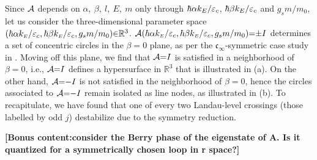\documentclass[aps, prb, showpacs, twocolumn, notitlepage, superscriptaddress]{revtex4-1}
\begin{document}
Since ${\cal A}$ depends on $\alpha,~\beta,~l,~E,~m$ only through $\hbar\alpha k_E /\varepsilon_c$, $\hbar\beta k_E /\varepsilon_c$ and $g_sm/m_0$, let us consider the three-dimensional parameter space $(\hbar\alpha k_{\scriptscriptstyle{E}}/\varepsilon_c,\hbar\beta k_{\scriptscriptstyle{E}}/\varepsilon_c,g_sm/m_0){\in} \mathbb{R}^3$.  ${\cal A}(\hbar\alpha k_{\scriptscriptstyle{E}}/\varepsilon_c,\hbar\beta k_{\scriptscriptstyle{E}}/\varepsilon_c,g_sm/m_0){=}{\pm} I$ determines a set of concentric circles in the $\beta{=}0$ plane, as per the $\mathfrak{c}_{\infty}$-symmetric case study in . Moving off this plane, we find that ${\cal A}{=}I$ is satisfied in a  neighborhood of $\beta{=}0$, i.e., ${\cal A}{=}I$ defines a hypersurface in $\mathbb{R}^3$ that is illustrated in (a). On the other hand, ${\cal A}{=}{-}I$ is not satisfied in the neighborhood of $\beta{=}0$, hence the circles associated to ${\cal A}{=}{-}I$ remain isolated as line nodes, as illustrated in (b). To recapitulate, we have found that one of every two Landau-level crossings (those labelled by odd $j$) destabilize due to the symmetry reduction.

\textbf{[Bonus content:consider the Berry phase of the eigenstate of A. Is it quantized for a symmetrically chosen loop in r space?]}
\end{document}
